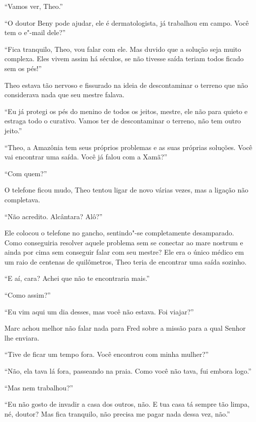 ``Vamos ver, Theo.''

``O doutor Beny pode ajudar, ele é dermatologista, já trabalhou em
campo. Você tem o e"-mail dele?''

``Fica tranquilo, Theo, vou falar com ele. Mas duvido que a solução seja
muito complexa. Eles vivem assim há séculos, se não tivesse saída teriam
todos ficado sem os pés!''

Theo estava tão nervoso e fissurado na ideia de descontaminar o terreno
que não considerava nada que seu mestre falava.

``Eu já protegi os pés do menino de todos os jeitos, mestre, ele não
para quieto e estraga todo o curativo. Vamos ter de descontaminar o
terreno, não tem outro jeito.''

``Theo, a Amazônia tem seus próprios problemas e as suas próprias
soluções. Você vai encontrar uma saída. Você já falou com a Xamã?''

``Com quem?''

O telefone ficou mudo, Theo tentou ligar de novo várias vezes, mas a
ligação não completava.

``Não acredito. Alcântara? Alô?''

Ele colocou o telefone no gancho, sentindo"-se completamente desamparado.
Como conseguiria resolver aquele problema sem se conectar ao mare
nostrum e ainda por cima sem conseguir falar com seu mestre? Ele era o
único médico em um raio de centenas de quilômetros, Theo teria de
encontrar uma saída sozinho.

\asterisc


``E aí, cara? Achei que não te encontraria mais.''

``Como assim?''

``Eu vim aqui um dia desses, mas você não estava. Foi viajar?''

Marc achou melhor não falar nada para Fred sobre a missão para a qual
Senhor  lhe enviara.

``Tive de ficar um tempo fora. Você encontrou com minha mulher?''

``Não, ela tava lá fora, passeando na praia. Como você não tava, fui
embora logo.''

``Mas nem trabalhou?''

``Eu não gosto de invadir a casa dos outros, não. E tua casa tá sempre
tão limpa, né, doutor? Mas fica tranquilo, não precisa me pagar nada
dessa vez, não.''

